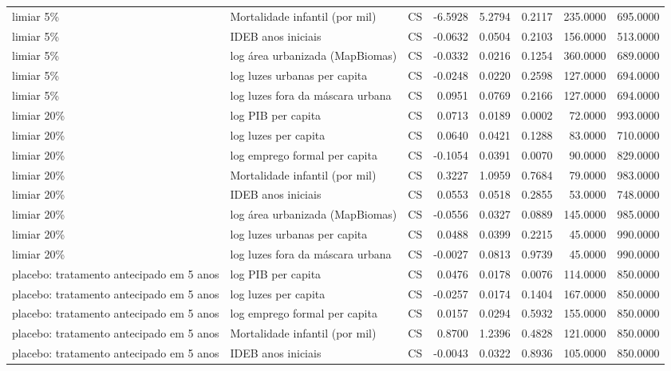 \begin{table}
\begin{tabular}{lllrrrrr}
limiar 5\% & Mortalidade infantil (por mil) & CS & -6.5928 & 5.2794 & 0.2117 & 235.0000 & 695.0000 \\
limiar 5\% & IDEB anos iniciais & CS & -0.0632 & 0.0504 & 0.2103 & 156.0000 & 513.0000 \\
limiar 5\% & log área urbanizada (MapBiomas) & CS & -0.0332 & 0.0216 & 0.1254 & 360.0000 & 689.0000 \\
limiar 5\% & log luzes urbanas per capita & CS & -0.0248 & 0.0220 & 0.2598 & 127.0000 & 694.0000 \\
limiar 5\% & log luzes fora da máscara urbana & CS & 0.0951 & 0.0769 & 0.2166 & 127.0000 & 694.0000 \\
limiar 20\% & log PIB per capita & CS & 0.0713 & 0.0189 & 0.0002 & 72.0000 & 993.0000 \\
limiar 20\% & log luzes per capita & CS & 0.0640 & 0.0421 & 0.1288 & 83.0000 & 710.0000 \\
limiar 20\% & log emprego formal per capita & CS & -0.1054 & 0.0391 & 0.0070 & 90.0000 & 829.0000 \\
limiar 20\% & Mortalidade infantil (por mil) & CS & 0.3227 & 1.0959 & 0.7684 & 79.0000 & 983.0000 \\
limiar 20\% & IDEB anos iniciais & CS & 0.0553 & 0.0518 & 0.2855 & 53.0000 & 748.0000 \\
limiar 20\% & log área urbanizada (MapBiomas) & CS & -0.0556 & 0.0327 & 0.0889 & 145.0000 & 985.0000 \\
limiar 20\% & log luzes urbanas per capita & CS & 0.0488 & 0.0399 & 0.2215 & 45.0000 & 990.0000 \\
limiar 20\% & log luzes fora da máscara urbana & CS & -0.0027 & 0.0813 & 0.9739 & 45.0000 & 990.0000 \\
placebo: tratamento antecipado em 5 anos & log PIB per capita & CS & 0.0476 & 0.0178 & 0.0076 & 114.0000 & 850.0000 \\
placebo: tratamento antecipado em 5 anos & log luzes per capita & CS & -0.0257 & 0.0174 & 0.1404 & 167.0000 & 850.0000 \\
placebo: tratamento antecipado em 5 anos & log emprego formal per capita & CS & 0.0157 & 0.0294 & 0.5932 & 155.0000 & 850.0000 \\
placebo: tratamento antecipado em 5 anos & Mortalidade infantil (por mil) & CS & 0.8700 & 1.2396 & 0.4828 & 121.0000 & 850.0000 \\
placebo: tratamento antecipado em 5 anos & IDEB anos iniciais & CS & -0.0043 & 0.0322 & 0.8936 & 105.0000 & 850.0000 \\

\end{tabular}
\end{table}
